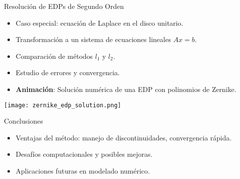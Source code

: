 \documentclass{beamer}
\begin{document}
\begin{frame}{Resolución de EDPs de Segundo Orden}
    \begin{itemize}
        \item Caso especial: ecuación de Laplace en el disco unitario.
        \item Transformación a un sistema de ecuaciones lineales $Ax = b$.
        \item Comparación de métodos $l_1$ y $l_2$.
        \item Estudio de errores y convergencia.
        \item \textbf{Animación}: Solución numérica de una EDP con polinomios de Zernike.
    \end{itemize}
    \centering
    \texttt{[image: zernike\_edp\_solution.png]} %
\end{frame}

\begin{frame}{Conclusiones}
    \begin{itemize}
        \item Ventajas del método: manejo de discontinuidades, convergencia rápida.
        \item Desafíos computacionales y posibles mejoras.
        \item Aplicaciones futuras en modelado numérico.
    \end{itemize}
\end{frame}
\end{document}
